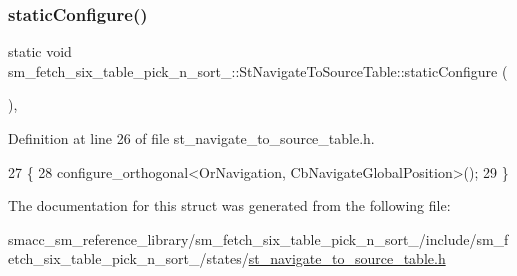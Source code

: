 \subsubsection{\texorpdfstring{static\+Configure()}{staticConfigure()}}
{\footnotesize\ttfamily static void sm\+\_\+fetch\+\_\+six\+\_\+table\+\_\+pick\+\_\+n\+\_\+sort\+\_\+::\+St\+Navigate\+To\+Source\+Table\+::static\+Configure (\begin{DoxyParamCaption}{ }\end{DoxyParamCaption})\hspace{0.3cm}{\ttfamily [inline]}, {\ttfamily [static]}}



Definition at line 26 of file st\+\_\+navigate\+\_\+to\+\_\+source\+\_\+table.\+h.


\begin{DoxyCode}
27         \{
28             configure\_orthogonal<OrNavigation, CbNavigateGlobalPosition>();
29         \}
\end{DoxyCode}


The documentation for this struct was generated from the following file\+:\begin{DoxyCompactItemize}
\item 
smacc\+\_\+sm\+\_\+reference\+\_\+library/sm\+\_\+fetch\+\_\+six\+\_\+table\+\_\+pick\+\_\+n\+\_\+sort\+\_/include/sm\+\_\+fetch\+\_\+six\+\_\+table\+\_\+pick\+\_\+n\+\_\+sort\+\_/states/\hyperlink{sm__fetch__six__table__pick__n__sort__1_2include_2sm__fetch__six__table__pick__n__sort__1_2state5e020896f3ab621d0e3d8db08e2ec8ea}{st\+\_\+navigate\+\_\+to\+\_\+source\+\_\+table.\+h}\end{DoxyCompactItemize}
